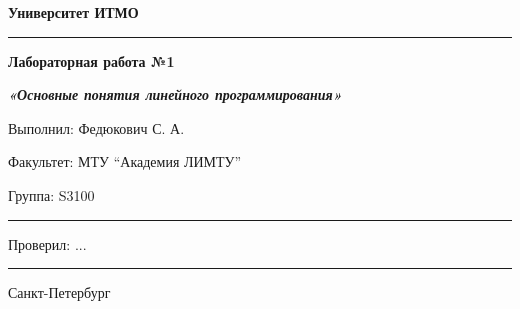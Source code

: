 \documentclass[12pt]{article}
\begin{document}
\pagestyle{empty}
\begin{center}
\large{\textbf{Университет ИТМО}}
\end{center}
\rule{500pt}{1pt}
\par\bigskip\par\bigskip\par\bigskip\par\bigskip\par\bigskip\par\bigskip\par\bigskip\par\bigskip
\begin{center}
\Large
\textbf{Лабораторная работа №1}

\textbf{\textit{«Основные понятия линейного программирования»}}


\end{center}
\par\bigskip\par\bigskip\par\bigskip\par\bigskip\par\bigskip\par\bigskip\par\bigskip\par\bigskip\par\bigskip\par\bigskip\par\bigskip\par\bigskip\par\bigskip\par\bigskip      
\begin{flushright}
\large
Выполнил: Федюкович С. А.
\par\bigskip
Факультет: МТУ “Академия ЛИМТУ”
\par\bigskip
Группа: S3100                       
\par\bigskip\par\bigskip\par\bigskip

\rule{150pt}{0.5pt}
\par\bigskip\par\bigskip\par\bigskip\par\bigskip                                                            
 Проверил: ...
\par\bigskip \par\bigskip

\rule{150pt}{0.5pt}
\end{flushright}
\par\bigskip\par\bigskip\par\bigskip\par\bigskip\par\bigskip\par\bigskip\par\bigskip\par\bigskip\par\bigskip\par\bigskip     
\begin{center}
\large
Санкт-Петербург
\par{}
\end{center}
\newpage
\end{document}
